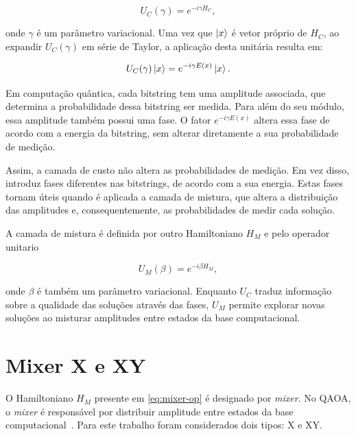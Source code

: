 \begin{equation}
U_C(\gamma) = e^{-i\gamma H_C},
\end{equation}

onde $\gamma$ é um parâmetro variacional. Uma vez que $\ket{x}$ é vetor próprio de $H_C$, ao expandir $U_C(\gamma)$ em série de Taylor, a aplicação desta unitária resulta em:

\begin{equation}
U_C(\gamma)\ket{x}
=
e^{-i\gamma E(x)}\ket{x}.
\end{equation}

Em computação quântica, cada bitstring tem uma amplitude associada, que determina a probabilidade dessa bitstring ser medida. Para além do seu módulo, essa amplitude também possui uma fase. O fator $e^{-i\gamma E(x)}$ altera essa fase de acordo com a energia da bitstring, sem alterar diretamente a sua probabilidade de medição.

Assim, a camada de custo não altera as probabilidades de medição. Em vez disso, introduz fases diferentes nas bitstrings, de acordo com a sua energia. Estas fases tornam úteis quando é aplicada a camada de mistura, que altera a distribuição das amplitudes e, consequentemente, as probabilidades de medir cada solução.

A camada de mistura é definida por outro Hamiltoniano $H_M$ e pelo operador unitario

\begin{equation}
\label{eq:mixer-op}
    U_M(\beta) = e^{-i\beta H_M},
\end{equation}

onde $\beta$ é também um parâmetro variacional. Enquanto $U_C$ traduz informação
sobre a qualidade das soluções através das fases, $U_M$ permite explorar novas
soluções ao misturar amplitudes entre estados da base computacional.

\section{Mixer X e XY}
\label{sec:mixer-x-xy}

O Hamiltoniano $H_M$ presente em \eqref{eq:mixer-op} é designado por \textit{mixer}. No \acs{QAOA}, o \textit{mixer} é responsável por distribuir amplitude entre estados da base computacional~\cite{Farhi2014QAOA,Hadfield2017AlternatingOperator}. Para este trabalho foram considerados dois tipos: X e XY.

